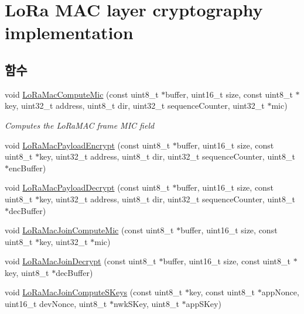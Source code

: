 \hypertarget{group___l_o_r_a_m_a_c___c_r_y_p_t_o}{}\section{Lo\+Ra M\+AC layer cryptography implementation}
\label{group___l_o_r_a_m_a_c___c_r_y_p_t_o}
\subsection*{함수}
\begin{DoxyCompactItemize}
\item 
void \mbox{\hyperlink{group___l_o_r_a_m_a_c___c_r_y_p_t_o_ga6ee265070494b83255e7fdc4dff985da}{Lo\+Ra\+Mac\+Compute\+Mic}} (const uint8\+\_\+t $\ast$buffer, uint16\+\_\+t size, const uint8\+\_\+t $\ast$key, uint32\+\_\+t address, uint8\+\_\+t dir, uint32\+\_\+t sequence\+Counter, uint32\+\_\+t $\ast$mic)
\begin{DoxyCompactList}\small\item\em Computes the Lo\+Ra\+M\+AC frame M\+IC field \end{DoxyCompactList}\item 
void \mbox{\hyperlink{group___l_o_r_a_m_a_c___c_r_y_p_t_o_ga50339e60abea2186ca7e584b489718b1}{Lo\+Ra\+Mac\+Payload\+Encrypt}} (const uint8\+\_\+t $\ast$buffer, uint16\+\_\+t size, const uint8\+\_\+t $\ast$key, uint32\+\_\+t address, uint8\+\_\+t dir, uint32\+\_\+t sequence\+Counter, uint8\+\_\+t $\ast$enc\+Buffer)
\item 
void \mbox{\hyperlink{group___l_o_r_a_m_a_c___c_r_y_p_t_o_ga41f9ba19f61b195420914ed58c8b94c7}{Lo\+Ra\+Mac\+Payload\+Decrypt}} (const uint8\+\_\+t $\ast$buffer, uint16\+\_\+t size, const uint8\+\_\+t $\ast$key, uint32\+\_\+t address, uint8\+\_\+t dir, uint32\+\_\+t sequence\+Counter, uint8\+\_\+t $\ast$dec\+Buffer)
\item 
void \mbox{\hyperlink{group___l_o_r_a_m_a_c___c_r_y_p_t_o_gac9216af326316c9e7f207d4e73aed199}{Lo\+Ra\+Mac\+Join\+Compute\+Mic}} (const uint8\+\_\+t $\ast$buffer, uint16\+\_\+t size, const uint8\+\_\+t $\ast$key, uint32\+\_\+t $\ast$mic)
\item 
void \mbox{\hyperlink{group___l_o_r_a_m_a_c___c_r_y_p_t_o_gac2379cd7cbeb6febaa2a7be5d9f04b5c}{Lo\+Ra\+Mac\+Join\+Decrypt}} (const uint8\+\_\+t $\ast$buffer, uint16\+\_\+t size, const uint8\+\_\+t $\ast$key, uint8\+\_\+t $\ast$dec\+Buffer)
\item 
void \mbox{\hyperlink{group___l_o_r_a_m_a_c___c_r_y_p_t_o_gad6fc2ace27fa388ec860fc2e5ae1f544}{Lo\+Ra\+Mac\+Join\+Compute\+S\+Keys}} (const uint8\+\_\+t $\ast$key, const uint8\+\_\+t $\ast$app\+Nonce, uint16\+\_\+t dev\+Nonce, uint8\+\_\+t $\ast$nwk\+S\+Key, uint8\+\_\+t $\ast$app\+S\+Key)
\end{DoxyCompactItemize}


